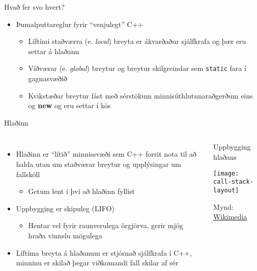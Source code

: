 \documentclass[handout]{beamer}
\begin{document}
\begin{frame}{Hvað fer svo hvert?}
\begin{itemize}
 \item Þumalputtareglur fyrir ``venjulegt'' C++
 \begin{itemize}
  \item Líftími staðværra (e. \emph{local}) breyta er ákvarðaður sjálfkrafa og þær eru settar á hlaðann
  \item Víðværar (e. \emph{global}) breytur og breytur skilgreindar sem \texttt{static} fara í gagnasvæðið
  \item Kvikstæðar breytur fást með sérstökum minnisúthlutunaraðgerðum eins og \textbf{new} og eru settar í kös
 \end{itemize}
\end{itemize}
\end{frame}

\begin{frame}{Hlaðinn}
\begin{columns}
\begin{itemize}
 \item Hlaðinn er ``lítið'' minnissvæði sem C++ forrit nota til að halda utan um staðværar breytur og upplýsingar um fallsköll
 \begin{itemize}
  \item Getum lent í því að hlaðinn fyllist
 \end{itemize}
 \item Uppbygging er skipuleg (LIFO)
 \begin{itemize}
  \item Hentar vel fyrir raunverulega örgjörva, gerir mjög hraða vinnslu mögulega
 \end{itemize}
 \item Líftíma breyta á hlaðanum er stjórnað sjálfkrafa í C++, minninu er skilað þegar viðkomandi fall skilar af sér
\end{itemize}
\begin{center}
Uppbygging hlaðans

\texttt{[image: call-stack-layout]}

{\tiny Mynd: \href{https://en.wikipedia.org/wiki/File:Call_stack_layout.svg}{Wikimedia}}
\end{center}
\end{columns}
\end{frame}
\end{document}
